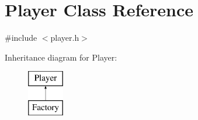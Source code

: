\hypertarget{class_player}{}\section{Player Class Reference}
\label{class_player}


{\ttfamily \#include $<$player.\+h$>$}

Inheritance diagram for Player\+:\begin{figure}[H]
\begin{center}
\leavevmode
\includegraphics[height=2.000000cm]{class_player}
\end{center}
\end{figure}
